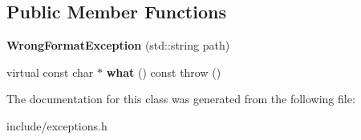 \subsection*{Public Member Functions}
\begin{DoxyCompactItemize}
\item 
\hypertarget{class_wrong_format_exception_ac4629be19e1e2238a78a26a36b460d44}{{\bfseries Wrong\+Format\+Exception} (std\+::string path)}\label{class_wrong_format_exception_ac4629be19e1e2238a78a26a36b460d44}

\item 
\hypertarget{class_wrong_format_exception_a26013218831b9785f02bd5c26e938492}{virtual const char $\ast$ {\bfseries what} () const   throw ()}\label{class_wrong_format_exception_a26013218831b9785f02bd5c26e938492}

\end{DoxyCompactItemize}


The documentation for this class was generated from the following file\+:\begin{DoxyCompactItemize}
\item 
include/exceptions.\+h\end{DoxyCompactItemize}

